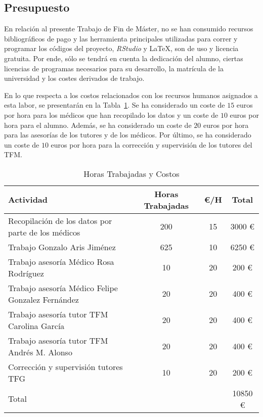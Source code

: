 \subsection{Presupuesto}\label{sec:presupuesto}

En relación al presente Trabajo de Fin de Máster, no se han consumido recursos bibliográficos de pago y las herramienta principales utilizadas para correr y programar los códigos del proyecto, \textit{RStudio} y \LaTeX, son de uso y licencia gratuita. Por ende, sólo se tendrá en cuenta la dedicación del alumno, ciertas licencias de programas necesarios para su desarrollo, la matrícula de la universidad y los costes derivados de trabajo.

En lo que respecta a los costos relacionados con los recursos humanos asignados a esta labor, se presentarán en la Tabla~\ref{tab:costes-rrhh}. Se ha considerado un coste de $15$ euros por hora para los médicos que han recopilado los datos y un coste de $10$ euros por hora para el alumno. Además, se ha considerado un coste de $20$ euros por hora para las asesorías de los tutores y de los médicos. Por último, se ha considerado un coste de $10$ euros por hora para la corrección y supervisión de los tutores del TFM.

\begin{table}[H]
    \centering
    \begin{tabular}{p{5cm}ccc}
    \toprule
    Actividad & Horas Trabajadas & €/H & Total \\
    \midrule
    Recopilación de los datos por parte de los médicos & 200 & 15 & 3000 € \\
    Trabajo Gonzalo Aris Jiménez & 625 & 10 & 6250 € \\
    Trabajo asesoría Médico Rosa Rodríguez & 10 & 20 & 200 €  \\
    Trabajo asesoría Médico Felipe Gonzalez Fernández & 20 & 20 & 400 € \\
    Trabajo asesoría tutor TFM Carolina García & 20 & 20 &  400 € \\
    Trabajo asesoría tutor TFM Andrés M. Alonso & 20 & 20 &  400 € \\
    Corrección y supervisión tutores TFG & 10 & 20 & 200 € \\
    \midrule
    Total & & & 10850 € \\
    \bottomrule
    \end{tabular}
    \caption{Horas Trabajadas y Costos}\label{tab:costes-rrhh}
 \end{table}


